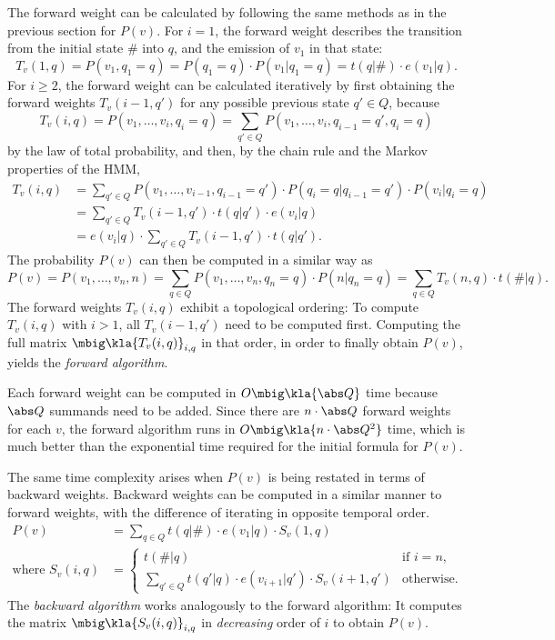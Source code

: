 The forward weight can be calculated by following the same methods as in the
previous section for $P(v)$. For $i = 1$, the forward weight describes the
transition from the initial state $\#$ into $q$, and the emission of $v_1$ in
that state:
\[
 T_v(1,q) = P(v_1,q_1=q) = P(q_1=q) \cdot P(v_1|q_1=q) = t(q|\#) \cdot e(v_1|q).
\]
For $i\geq 2$, the forward weight can be calculated iteratively by first
obtaining the forward weights $T_v(i-1,q')$ for any possible previous state
$q'\in Q$, because
\[
 T_v(i,q) = P(v_1,\ldots,v_i,q_i=q) = \sum_{q'\in Q} P(v_1,\ldots,v_i,q_{i-1}=q',q_i=q)
\]
by the law of total probability, and then, by the chain rule and the Markov
properties of the HMM,
\begin{align}
 T_v(i,q)
  &= \sum_{q'\in Q} P(v_1,\ldots,v_{i-1},q_{i-1}=q') \cdot P(q_i=q|q_{i-1}=q') \cdot P(v_i|q_i=q) \nonumber\\
  &= \sum_{q'\in Q} T_v(i-1,q') \cdot t(q|q') \cdot e(v_i|q) \nonumber\\
  &= e(v_i|q) \cdot \sum_{q'\in Q} T_v(i-1,q') \cdot t(q|q'). \label{eq:03-T_v}
\end{align}
The probability $P(v)$ can then be computed in a similar way as
\begin{equation}\label{eq:03-p-by-t}
 P(v) = P(v_1,\ldots,v_n,n) = \sum_{q\in Q} P(v_1,\ldots,v_n,q_n=q) \cdot P(n|q_n=q) = \sum_{q\in Q} T_v(n,q) \cdot t(\#|q).
\end{equation}
The forward weights $T_v(i,q)$ exhibit a topological ordering: To compute
$T_v(i,q)$ with $i>1$, all $T_v(i-1,q')$ need to be computed first. Computing
the full matrix $\mbig\kla{T_v(i,q)}_{i,q}$ in that order, in order to finally
obtain $P(v)$, yields the \emph{forward algorithm}.

Each forward weight can be computed in $O\mbig\kla{\abs Q}$ time because $\abs
Q$ summands need to be added. Since there are $n\cdot\abs Q$ forward weights
for each $v$, the forward algorithm runs in $O\mbig\kla{n \cdot \abs Q^2}$
time, which is much better than the exponential time required for the initial
formula for $P(v)$.

The same time complexity arises when $P(v)$ is being restated in terms of
backward weights. Backward weights can be computed in a similar manner to
forward weights, with the difference of iterating in opposite temporal order.
\begin{align}
 P(v) &= \sum_{q\in Q} t(q|\#) \cdot e(v_1|q) \cdot S_v(1,q) \label{eq:03-p-by-s} \\
 \text{where } S_v(i,q) &= \begin{cases}
  t(\#|q) & \text{if }i=n, \\
  \sum_{q'\in Q} t(q'|q) \cdot e(v_{i+1}|q') \cdot S_v(i+1,q') & \text{otherwise}.
 \end{cases} \label{eq:03-S_v}
\end{align}
The \emph{backward algorithm} works analogously to the forward algorithm: It
computes the matrix $\mbig\kla{S_v(i,q)}_{i,q}$ in \emph{decreasing} order of
$i$ to obtain $P(v)$.

